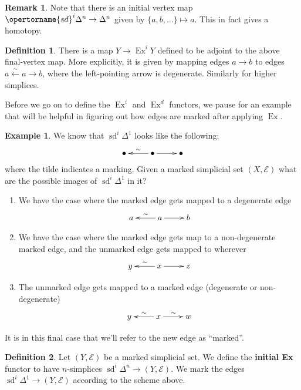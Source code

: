 \documentclass[english]{amsart}
\newcommand{\mc}{\mathcal}
\theoremstyle{definition}
\newtheorem*{defn}{Definition}
\newtheorem*{example}{Example}
\newtheorem*{rmk}{Remark}
\begin{document}
\begin{rmk}
Note that there is an initial vertex map $\opertorname{sd}^i \Delta^n \to \Delta^n$ given by $\{a, b, \dots\} \mapsto a$. This in fact gives a homotopy. 
\end{rmk}

\begin{defn}
There is a map $Y \to \operatorname{Ex}^i Y$ defined to be adjoint to the above final-vertex map. More explicitly, it is given by mapping edges $a\to b$ to edges $a \xleftarrow{\sim} a \to b$, where the left-pointing arrow is degenerate. Similarly for higher simplices. 
\end{defn}

Before we go on to define the $\operatorname{Ex}^i$ and $\operatorname{Ex}^d$ functors, we pause for an example that will be helpful in figuring out how edges are marked after applying $\operatorname{Ex}$.

\begin{example}
We know that $\operatorname{sd}^i \Delta^1$ looks like the following:
\[
\xymatrix{
\bullet  & \bullet \ar[l]_\sim \ar[r] & \bullet
}
\]
where the tilde indicates a marking. Given a marked simplicial set $(X,\mc{E})$ what are the possible images of $\operatorname{sd}^i \Delta^1$ in it?

\begin{enumerate}
\item We have the case where the marked edge gets mapped to a degenerate edge
\[
\xymatrix{
a  & a \ar[l]_\sim \ar[r] & b
}
\]
\item We have the case where the marked edge gets map to a non-degenerate marked edge, and the unmarked edge gets mapped to wherever
\[
\xymatrix{
y  & x \ar[l]_\sim \ar[r] & z
}
\]
\item The unmarked edge gets mapped to a marked edge (degenerate or non-degenerate)
\[
\xymatrix{
y  & x \ar[l]_\sim \ar[r]^\sim & w
}
\]
\end{enumerate}
It is in this final case that we'll refer to the new edge as ``marked''. 
\end{example} 




\begin{defn}
Let $(Y, \mc{E})$ be a marked simplicial set. We define the \textbf{initial Ex} functor to have $n$-simplices $\operatorname{sd}^i \Delta^n \to (Y,\mc{E})$. We mark the edges $\operatorname{sd}^i \Delta^1 \to (Y,\mc{E})$ according to the scheme above.  
\end{defn}
\end{document}

